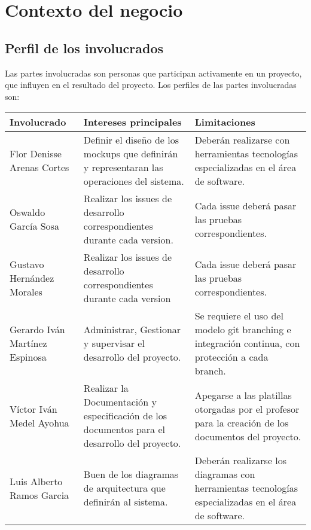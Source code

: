 \documentclass[12pt,a4paper]{book}
\begin{document}
\chapter{Contexto del negocio}
\section{Perfil de los involucrados}
Las partes involucradas son personas que participan activamente en un proyecto, que influyen en el resultado del proyecto. Los perfiles de las partes involucradas son:
\begin{table}[h!]
\begin{tabular}{|p{5 cm}|p{5 cm}|p{5 cm}|}
\hline
\textbf{Involucrado}&\textbf{Intereses principales}&\textbf{Limitaciones}
\\\hline

Flor Denisse Arenas Cortes&Definir el diseño de los mockups que definirán y representaran las operaciones del sistema. & Deberán realizarse con herramientas tecnologías especializadas en el área de software.\\\hline

Oswaldo García Sosa&Realizar los issues de desarrollo correspondientes durante cada version. &Cada issue deberá pasar las pruebas correspondientes.\\\hline

Gustavo Hernández Morales&Realizar los issues de desarrollo correspondientes durante cada version &Cada issue deberá pasar las pruebas correspondientes.\\\hline

Gerardo Iván Martínez Espinosa & Administrar, Gestionar y supervisar el desarrollo del proyecto.&Se requiere el uso del modelo git branching e integración continua, con protección a cada branch.\\\hline

Víctor Iván Medel Ayohua &Realizar la Documentación y especificación de los documentos para el desarrollo del proyecto.&Apegarse a las platillas otorgadas por el profesor para la creación de los documentos del proyecto.\\\hline

Luis Alberto Ramos Garcia&Buen de los diagramas de arquitectura que definirán al sistema. & Deberán realizarse los diagramas con herramientas tecnologías especializadas en el área de software.\\\hline
\end{tabular}
\end{table}
\newpage
\end{document}
